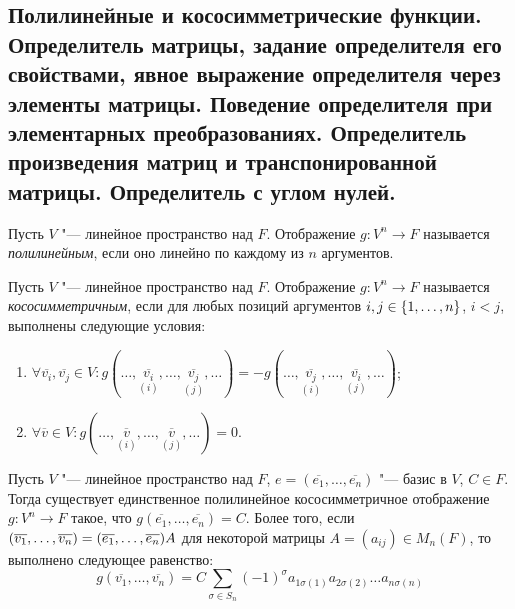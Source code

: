 \subsection{Полилинейные и кососимметрические функции. Определитель матрицы, задание определителя его свойствами, явное выражение определителя через элементы матрицы. Поведение определителя при элементарных преобразованиях. Определитель произведения матриц и транспонированной матрицы. Определитель с углом нулей.}
    
    \begin{definition}
    	Пусть $V$ "--- линейное пространство над $F$. Отображение $g: V^n \rightarrow F$ называется \textit{полилинейным}, если оно линейно по каждому из $n$ аргументов.
    \end{definition}
    
    \begin{definition}
    	Пусть $V$ "--- линейное пространство над $F$. Отображение $g: V^n \rightarrow F$ называется \textit{кососимметричным}, если для любых позиций аргументов $i, j \in \{1, \dotsc, n\}$, $i < j$, выполнены следующие условия:
    	\begin{enumerate}
    		\item $\forall \overline{v_i}, \overline{v_j} \in V: g(\dots, \underset{(i)}{\overline{v_i}}, \dots, \underset{(j)}{\overline{v_j}}, \dots) = -g(\dots, \underset{(i)}{\overline{v_j}}, \dots, \underset{(j)}{\overline{v_i}}, \dots)$;
    		\item $\forall \overline{v} \in V: g(\dots, \underset{(i)}{\overline{v}}, \dots, \underset{(j)}{\overline{v}}, \dots) = 0$.
    	\end{enumerate}
    \end{definition}

    \begin{theorem}
	Пусть $V$ "--- линейное пространство над $F$, $e = (\overline{e_1}, \dots, \overline{e_n})$ "--- базис в $V$, $C \in F$. Тогда существует единственное полилинейное кососимметричное отображение $g: V^n \to F$ такое, что $g(\overline{e_1}, \dots, \overline{e_n}) = C$. Более того, если $(\overline{v_1}, \dots, \overline{v_n}) \hm{=} (\overline{e_1}, \dots, \overline{e_n})A$ для некоторой матрицы $A = (a_{ij}) \in M_n(F)$, то выполнено следующее равенство:
	\[g(\overline{v_1}, \dots, \overline{v_n}) = C\sum_{\sigma \in S_n}(-1)^\sigma a_{1 \sigma(1)}a_{2 \sigma(2)}\dots a_{n \sigma(n)}\]
\end{theorem}

